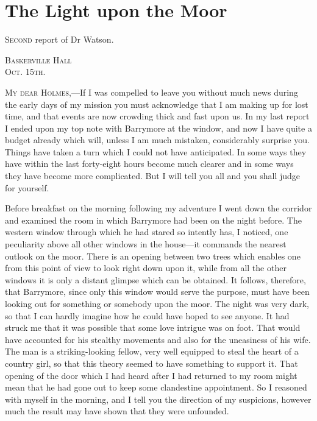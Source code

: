 \chapter{The Light upon the Moor}

\lettrine[lines=4]{S}{econd} report of Dr Watson. \\
\begin{flushright}
\hfill\begin{minipage}{0.3\linewidth}\textsc{Baskerville Hall\\Oct. 15th.}\end{minipage}
\end{flushright}

\textsc{My dear Holmes},—If I was compelled to leave you without much news during the early days of my mission you must acknowledge that I am making up for lost time, and that events are now crowding thick and fast upon us. In my last report I ended upon my top note with Barrymore at the window, and now I have quite a budget already which will, unless I am much mistaken, considerably surprise you. Things have taken a turn which I could not have anticipated. In some ways they have within the last forty-eight hours become much clearer and in some ways they have become more complicated. But I will tell you all and you shall judge for yourself.

Before breakfast on the morning following my adventure I went down the corridor and examined the room in which Barrymore had been on the night before. The western window through which he had stared so intently has, I noticed, one peculiarity above all other windows in the house—it commands the nearest outlook on the moor. There is an opening between two trees which enables one from this point of view to look right down upon it, while from all the other windows it is only a distant glimpse which can be obtained. It follows, therefore, that Barrymore, since only this window would serve the purpose, must have been looking out for something or somebody upon the moor. The night was very dark, so that I can hardly imagine how he could have hoped to see anyone. It had struck me that it was possible that some love intrigue was on foot. That would have accounted for his stealthy movements and also for the uneasiness of his wife. The man is a striking-looking fellow, very well equipped to steal the heart of a country girl, so that this theory seemed to have something to support it. That opening of the door which I had heard after I had returned to my room might mean that he had gone out to keep some clandestine appointment. So I reasoned with myself in the morning, and I tell you the direction of my suspicions, however much the result may have shown that they were unfounded.

